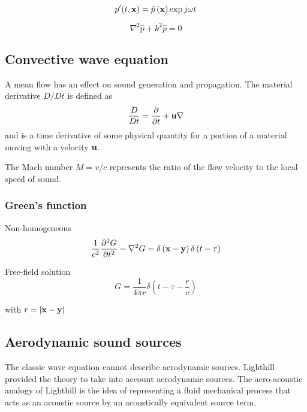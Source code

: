 \begin{equation}
  p' (t, \mathbf{x}) = \hat{p} \left(\mathbf{x}\right) \exp{j \omega t}
\end{equation}


\begin{equation}\label{eq:theory:sound:wave:helmholtz}
 \nabla^2 \hat{p} + k^2 \hat{p} = 0
\end{equation}


\subsection{Convective wave equation}
A mean flow has an effect on sound generation and propagation.
The material derivative $D/Dt$ is defined as
\begin{equation}
  \frac{D}{Dt} = \frac{\partial}{\partial t} + \mathbf{u} \nabla
\end{equation}
and is a time derivative of some physical quantity for a portion of a material moving with a velocity $\mathbf{u}$.



The Mach number $M = v / c$ represents the ratio of the flow velocity to the
local speed of sound.



\subsubsection*{Green's function}\label{sec:theory:sound:green}
%
Non-homogeneous
\begin{equation}
\frac{1}{c^2}\frac{\partial^2 G}{\partial t^2} - \nabla^2 G = \delta \left( \mathbf{x} - \mathbf{y} \right) \delta \left(t - \tau \right)
\end{equation}

Free-field solution
\begin{equation}
 G = \frac{1}{4 \pi r} \delta \left( t - \tau - \frac{r}{c} \right)
\end{equation}

with $r = \left| \mathbf{x} - \mathbf{y} \right|$


\subsection{Aerodynamic sound sources}\label{sec:theory:sound:aerodynamic}
The classic wave equation cannot describe aerodynamic sources. Lighthill
provided the theory to take into account aerodynamic sources. The aero-acoustic
analogy of Lighthill is the idea of representing a fluid mechanical process that
acts as an acoustic source by an acoustically equivalent source term.

